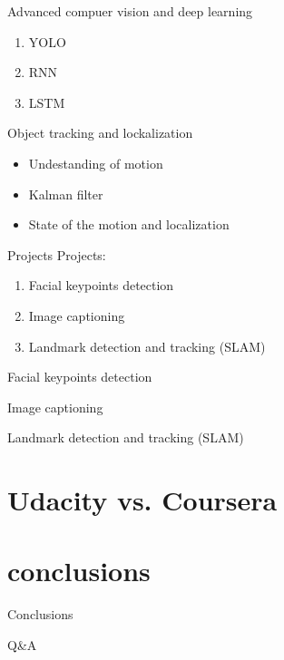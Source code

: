 \documentclass{beamer}
\begin{document}
\begin{frame}{Advanced compuer vision and deep learning}
\begin{enumerate}
\item YOLO
\item RNN
\item LSTM
\end{enumerate}
\end{frame}

\begin{frame}{Object tracking and lockalization}
\begin{itemize}
\item Undestanding of motion
\item Kalman filter
\item State of the motion and localization
\end{itemize}
\end{frame}


\begin{frame}{Projects}
Projects:
\begin{enumerate}
\item Facial keypoints detection
\item Image captioning
\item Landmark detection and tracking (SLAM)
\end{enumerate}
\end{frame}

\begin{frame}{Facial keypoints detection}
\end{frame}

\begin{frame}{Image captioning}
\end{frame}

\begin{frame}{Landmark detection and tracking (SLAM)}
\end{frame}


\section{Udacity vs. Coursera}


\section{conclusions}
\begin{frame}{Conclusions}
\end{frame}

\begin{frame}{Q\&A}
\end{frame}
\end{document}

